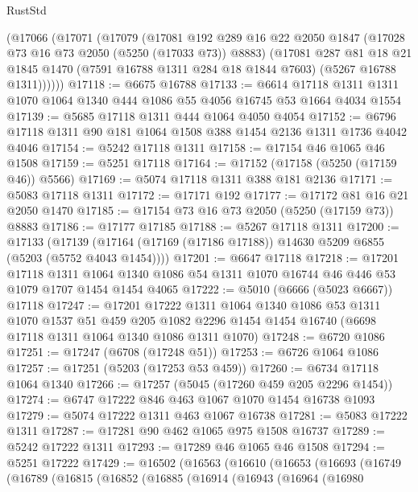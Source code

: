 \begin{lexlean}{RustStd}
\begin{coremodule}
    (@17066
      (@17071
        (@17079
          (@17081
            @192
            @289
            @16
            @22
            @2050
            @1847
            (@17028 @73 @16 @73 @2050 (@5250 (@17033 @73)) @8883)
            (@17081
              @287
              @81
              @18
              @21
              @1845
              @1470
              (@7591 @16788 @1311 @284 @18 @1844 @7603)
              (@5267 @16788 @1311))))))
@17118 := @6675 @16788
@17133 := @6614
    @17118
    @1311
    @1311
    @1070
    @1064
    @1340
    @444
    @1086
    @55
    @4056
    @16745
    @53
    @1664
    @4034
    @1554
@17139 := @5685 @17118 @1311 @444 @1064 @4050 @4054
@17152 := @6796 @17118 @1311 @90 @181 @1064 @1508 @388 @1454 @2136 @1311 @1736 @4042 @4046
@17154 := @5242 @17118 @1311
@17158 := @17154 @46 @1065 @46 @1508
@17159 := @5251 @17118
@17164 := @17152 (@17158 (@5250 (@17159 @46)) @5566)
@17169 := @5074 @17118 @1311 @388 @181 @2136
@17171 := @5083 @17118 @1311
@17172 := @17171 @192
@17177 := @17172 @81 @16 @21 @2050 @1470
@17185 := @17154 @73 @16 @73 @2050 (@5250 (@17159 @73)) @8883
@17186 := @17177 @17185
@17188 := @5267 @17118 @1311
@17200 := @17133
    (@17139 (@17164 (@17169 (@17186 @17188)) @14630 @5209 @6855 (@5203 (@5752 @4043 @1454))))
@17201 := @6647 @17118
@17218 := @17201
    @17118
    @1311
    @1064
    @1340
    @1086
    @54
    @1311
    @1070
    @16744
    @46
    @446
    @53
    @1079
    @1707
    @1454
    @1454
    @4065
@17222 := @5010 (@6666 (@5023 @6667)) @17118
@17247 := @17201
    @17222
    @1311
    @1064
    @1340
    @1086
    @53
    @1311
    @1070
    @1537
    @51
    @459
    @205
    @1082
    @2296
    @1454
    @1454
    @16740
    (@6698 @17118 @1311 @1064 @1340 @1086 @1311 @1070)
@17248 := @6720 @1086
@17251 := @17247 (@6708 (@17248 @51))
@17253 := @6726 @1064 @1086
@17257 := @17251 (@5203 (@17253 @53 @459))
@17260 := @6734 @17118 @1064 @1340
@17266 := @17257 (@5045 (@17260 @459 @205 @2296 @1454))
@17274 := @6747 @17222 @846 @463 @1067 @1070 @1454 @16738 @1093
@17279 := @5074 @17222 @1311 @463 @1067 @16738
@17281 := @5083 @17222 @1311
@17287 := @17281 @90 @462 @1065 @975 @1508 @16737
@17289 := @5242 @17222 @1311
@17293 := @17289 @46 @1065 @46 @1508
@17294 := @5251 @17222
@17429 := @16502
    (@16563
      (@16610
        (@16653
          (@16693
            (@16749
              (@16789
                (@16815
                  (@16852
                    (@16885
                      (@16914
                        (@16943
                          (@16964
                            (@16980

\end{coremodule}
\end{lexlean}

